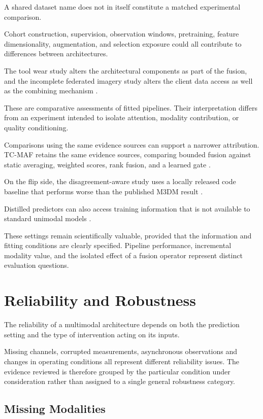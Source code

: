 A shared dataset name does not in itself constitute a matched experimental comparison.

Cohort construction, supervision, observation windows, pretraining, feature dimensionality,
augmentation, and selection exposure could all contribute to differences between architectures.

The tool wear study alters the architectural components as part of the fusion, and the incomplete
federated imagery study alters the client data access as well as the combining mechanism
\parencite{P045,P051}.

These are comparative assessments of fitted pipelines. Their interpretation differs from an
experiment intended to isolate attention, modality contribution, or quality conditioning.

Comparisons using the same evidence sources can support a narrower attribution. TC-MAF retains the
same evidence sources, comparing bounded fusion against static averaging, weighted scores, rank
fusion, and a learned gate \parencite[Table~3]{P026}.

On the flip side, the disagreement-aware study uses a locally released code baseline that performs
worse than the published M3DM result \parencite[Table~4]{P033}.

Distilled predictors can also access training information that is not available to standard unimodal
models \parencite{Li2025PGMTKD}.

These settings remain scientifically valuable, provided that the information and fitting conditions
are clearly specified. Pipeline performance, incremental modality value, and the isolated effect of
a fusion operator represent distinct evaluation questions.

\section{Reliability and Robustness}

The reliability of a multimodal architecture depends on both the prediction setting and the type of
intervention acting on its inputs.

Missing channels, corrupted measurements, asynchronous observations and changes in operating
conditions all represent different reliability issues. The evidence reviewed is therefore grouped by
the particular condition under consideration rather than assigned to a single general robustness
category.

\subsection{Missing Modalities}


